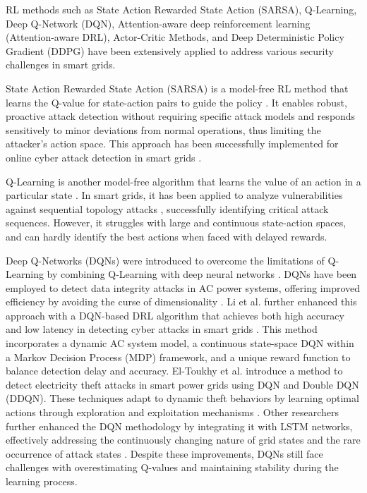 \documentclass[10pt, journal]{IEEEtran}
\begin{document}
RL methods such as State Action Rewarded State Action (SARSA), Q-Learning, Deep Q-Network (DQN), Attention-aware deep reinforcement learning (Attention-aware DRL), Actor-Critic Methods, and Deep Deterministic Policy Gradient (DDPG) have been extensively applied to address various security challenges in smart grids. 

State Action Rewarded State Action (SARSA) is a model-free RL method that learns the Q-value for state-action pairs to guide the policy \cite{sutton1998introduction}. It enables robust, proactive attack detection without requiring specific attack models and responds sensitively to minor deviations from normal operations, thus limiting the attacker's action space. This approach has been successfully implemented for online cyber attack detection in smart grids \cite{kurt2018online}.

Q-Learning is another model-free algorithm that learns the value of an action in a particular state \cite{watkins1992q}. In smart grids, it has been applied to analyze vulnerabilities against sequential topology attacks \cite{yan2016q}, successfully identifying critical attack sequences. However, it struggles with large and continuous state-action spaces, and can hardly identify the best actions when faced with delayed rewards.

Deep Q-Networks (DQNs) were introduced to overcome the limitations of Q-Learning by combining Q-Learning with deep neural networks \cite{mnih2015human}. DQNs have been employed to detect data integrity attacks in AC power systems, offering improved efficiency by avoiding the curse of dimensionality \cite{an2019defending}. Li et al. further enhanced this approach with a DQN-based DRL algorithm that achieves both high accuracy and low latency in detecting cyber attacks in smart grids \cite{li2022low}. This method incorporates a dynamic AC system model, a continuous state-space DQN within a Markov Decision Process (MDP) framework, and a unique reward function to balance detection delay and accuracy. El-Toukhy et al. introduce a method to detect electricity theft attacks in smart power grids using DQN and Double DQN (DDQN). These techniques adapt to dynamic theft behaviors by learning optimal actions through exploration and exploitation mechanisms \cite{el2023electricity}. Other researchers further enhanced the DQN methodology by integrating it with LSTM networks, effectively addressing the continuously changing nature of grid states and the rare occurrence of attack states \cite{an2022data}. Despite these improvements, DQNs still face challenges with overestimating Q-values and maintaining stability during the learning process.
\end{document}
